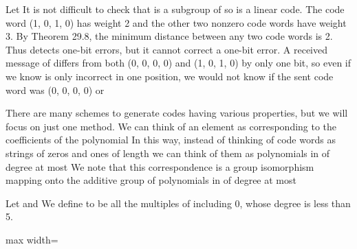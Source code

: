 \documentclass[11pt,oneside]{article}
\begin{document}
\begin{BookBody}
 Let  It is not difficult to check that  is a subgroup of  so  is a linear code. The code word (1, 0, 1, 0) has weight 2 and the other two nonzero code words have weight 3. By Theorem 29.8, the minimum distance between any two code words is 2. Thus  detects one-bit errors, but it cannot correct a one-bit error. A received message of  differs from both (0, 0, 0, 0) and (1, 0, 1, 0) by only one bit, so even if we know  is only incorrect in one position, we would not know if the sent code word was (0, 0, 0, 0) or \BookEnd{\blacktriangle}

There are many schemes to generate codes having various properties, but we will focus on just one method. We can think of an element  as corresponding to the coefficients of the polynomial   In this way, instead of thinking of code words as strings of zeros and ones of length  we can think of them as polynomials in  of degree at most  We note that this correspondence is a group isomorphism \BookInline{\phi } mapping  onto the additive group of polynomials in  of degree at most 

 Let  and  We define  to be all the multiples of  including 0, whose degree is less than 5.

\begin{center}\begin{adjustbox}{max width=\linewidth}\end{adjustbox}\end{center}


\end{BookBody}
\end{document}
